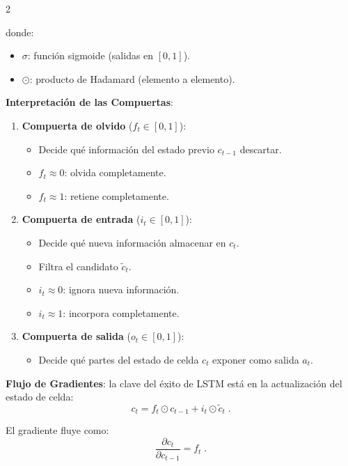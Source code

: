 \documentclass[12pt]{report}
\newenvironment{tightmulticols}{%
  \begin{multicols}{2}
  \setlength{\parskip}{1.2pt}
  \linespread{1}\selectfont
}{%
  \end{multicols}
}
\begin{document}
\begin{tightmulticols}

\noindent donde:
\begin{itemize}
    \item $\sigma$: función sigmoide (salidas en $[0,1]$).
    \item $\odot$: producto de Hadamard (elemento a elemento).
\end{itemize}

\noindent\textbf{Interpretación de las Compuertas}:

\begin{enumerate}
    \item \textbf{Compuerta de olvido} ($f_t \in [0,1]$):
    \begin{itemize}
        \item Decide qué información del estado previo $c_{t-1}$ descartar.
        \item $f_t \approx 0$: olvida completamente.
        \item $f_t \approx 1$: retiene completamente.
    \end{itemize}
    
    \item \textbf{Compuerta de entrada} ($i_t \in [0,1]$):
    \begin{itemize}
        \item Decide qué nueva información almacenar en $c_t$.
        \item Filtra el candidato $\tilde{c}_t$.
        \item $i_t \approx 0$: ignora nueva información.
        \item $i_t \approx 1$: incorpora completamente.
    \end{itemize}
    
    \item \textbf{Compuerta de salida} ($o_t \in [0,1]$):
    \begin{itemize}
        \item Decide qué partes del estado de celda $c_t$ exponer como salida $a_t$.
    \end{itemize}
\end{enumerate}

\noindent\textbf{Flujo de Gradientes}: la clave del éxito de LSTM está en la actualización del estado de celda:
\begin{equation*}
    c_t = f_t \odot c_{t-1} + i_t \odot \tilde{c}_t \; .
\end{equation*}

\noindent El gradiente fluye como:
\begin{equation*}
    \frac{\partial c_t}{\partial c_{t-1}} = f_t \; .
\end{equation*}


\end{tightmulticols}
\end{document}
